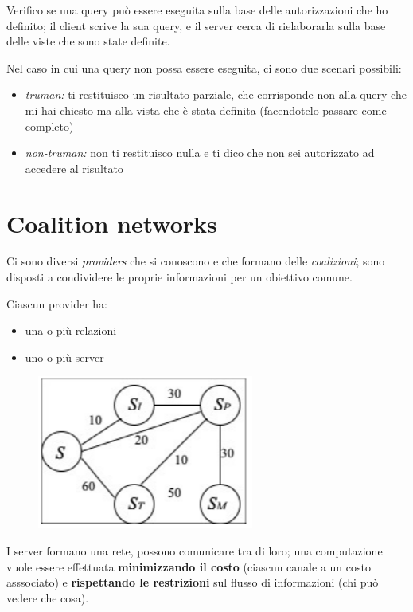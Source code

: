 \documentclass{report}
\begin{document}
\noindent Verifico se una query può essere eseguita sulla base delle autorizzazioni che 
ho definito; il client scrive la sua query, e il server cerca di rielaborarla 
sulla base delle viste che sono state definite.

\noindent Nel caso in cui una query non possa essere eseguita, ci sono due scenari possibili:
\begin{itemize}
    \item \textit{truman:} ti restituisco un risultato parziale, che corrisponde non alla query che mi hai chiesto ma alla vista che è stata definita (facendotelo 
    passare come completo)
    \item \textit{non-truman:} non ti restituisco nulla e ti dico che non sei autorizzato ad accedere al risultato 
\end{itemize}


\section{Coalition networks}
Ci sono diversi \textit{providers} che si conoscono e che formano delle \textit{coalizioni}; sono 
disposti a condividere le proprie informazioni per un obiettivo comune.

\noindent Ciascun provider ha:
\begin{itemize}
    \item una o più relazioni 
    \item uno o più server
\end{itemize}

\begin{figure}[H]
    \centering
    \includegraphics[width=0.4\linewidth]{images/pairwise-auth.png}
\end{figure}

\noindent I server formano una rete, possono comunicare tra di loro; una computazione vuole essere effettuata 
\textbf{minimizzando il costo} (ciascun canale a un costo asssociato) e \textbf{rispettando le restrizioni} 
sul flusso di informazioni (chi può vedere che cosa).
\end{document}
